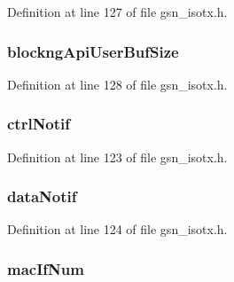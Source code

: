 Definition at line 127 of file gsn\_\-isotx.h.

\hypertarget{a00102_ad828642fbf78687924f94c89931c9e13}{
\subsubsection[{blockngApiUserBufSize}]{ {\bf blockngApiUserBufSize}}}
\label{a00102_ad828642fbf78687924f94c89931c9e13}


Definition at line 128 of file gsn\_\-isotx.h.

\hypertarget{a00102_a5bbfd95e414448e1b9d5e929adaf91ee}{
\subsubsection[{ctrlNotif}]{ {\bf ctrlNotif}}}
\label{a00102_a5bbfd95e414448e1b9d5e929adaf91ee}


Definition at line 123 of file gsn\_\-isotx.h.

\hypertarget{a00102_a774a8c18138a261927600b915c5296c1}{
\subsubsection[{dataNotif}]{ {\bf dataNotif}}}
\label{a00102_a774a8c18138a261927600b915c5296c1}


Definition at line 124 of file gsn\_\-isotx.h.

\hypertarget{a00102_ae57ae92e651751e7978e237c55133b4c}{
\subsubsection[{macIfNum}]{ {\bf macIfNum}}}
\label{a00102_ae57ae92e651751e7978e237c55133b4c}


